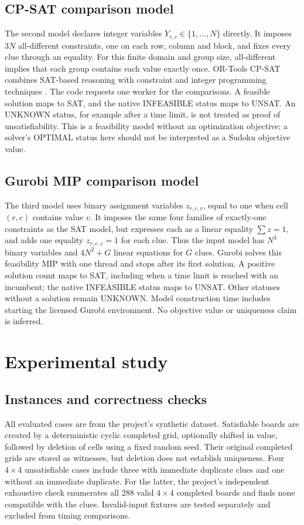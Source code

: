 \documentclass[a4paper,fleqn]{cas-sc}
\begin{document}
\subsection{CP-SAT comparison model}
The second model declares integer variables \(Y_{r,c}\in\{1,\ldots,N\}\) directly. It imposes \(3N\) all-different constraints, one on each row, column and block, and fixes every clue through an equality. For this finite domain and group size, all-different implies that each group contains each value exactly once. OR-Tools CP-SAT combines SAT-based reasoning with constraint and integer programming techniques \cite{cpsat}. The code requests one worker for the comparisons. A feasible solution maps to SAT, and the native INFEASIBLE status maps to UNSAT. An UNKNOWN status, for example after a time limit, is not treated as proof of unsatisfiability. This is a feasibility model without an optimization objective; a solver's OPTIMAL status here should not be interpreted as a Sudoku objective value.

\subsection{Gurobi MIP comparison model}
The third model uses binary assignment variables \(z_{r,c,v}\), equal to one when cell \((r,c)\) contains value \(v\). It imposes the same four families of exactly-one constraints as the SAT model, but expresses each as a linear equality \(\sum z=1\), and adds one equality \(z_{r,c,v}=1\) for each clue. Thus the input model has \(N^3\) binary variables and \(4N^2+G\) linear equations for \(G\) clues. Gurobi \cite{gurobi} solves this feasibility MIP with one thread and stops after its first solution. A positive solution count maps to SAT, including when a time limit is reached with an incumbent; the native INFEASIBLE status maps to UNSAT. Other statuses without a solution remain UNKNOWN. Model construction time includes starting the licensed Gurobi environment. No objective value or uniqueness claim is inferred.

\section{Experimental study}
\subsection{Instances and correctness checks}
All evaluated cases are from the project's synthetic dataset. Satisfiable boards are created by a deterministic cyclic completed grid, optionally shifted in value, followed by deletion of cells using a fixed random seed. Their original completed grids are stored as witnesses, but deletion does not establish uniqueness. Four \(4\times4\) unsatisfiable cases include three with immediate duplicate clues and one without an immediate duplicate. For the latter, the project's independent exhaustive check enumerates all 288 valid \(4\times4\) completed boards and finds none compatible with the clues. Invalid-input fixtures are tested separately and excluded from timing comparisons.
\end{document}
